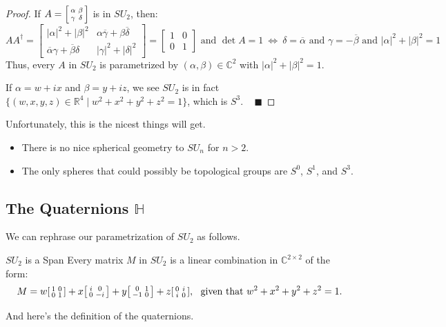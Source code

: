 \begin{proof}
    If $A = \begin{bsmallmatrix} \alpha & \beta \\ \gamma & \delta \end{bsmallmatrix}$ is in $SU_2$, then:
    \[ AA^{\dagger} = \begin{bmatrix} |\alpha|^2 + |\beta|^2 & \alpha \overline{\gamma} + \beta \overline{\delta} \\ \overline{\alpha}\gamma + \overline{\beta}\delta & |\gamma|^2 + |\delta|^2 \end{bmatrix} = \begin{bmatrix} 1 & 0 \\ 0 & 1 \end{bmatrix} \text{ and } \det A = 1 ~ \iff ~ \delta = \overline{\alpha} \text{ and } \gamma = - \overline{\beta} \text{ and } |\alpha|^2 + |\beta|^2 = 1 \]
    Thus, every $A$ in $SU_2$ is parametrized by $(\alpha, \beta) \in \mathbb{C}^2$ with $|\alpha|^2 + |\beta|^2 = 1$.
    
    If $\alpha = w + ix$ and $\beta = y + iz$, we see $SU_2$ is in fact $\{(w, x, y, z) \in \mathbb{R}^4 \mid w^2 + x^2 + y^2 + z^2 = 1\}$, which is $S^3$. ~ $\blacksquare$
\end{proof}

\begin{remark}
    Unfortunately, this is the nicest things will get.
    \begin{itemize}
        \item There is no nice spherical geometry to $SU_n$ for $n > 2$.
        \item The only spheres that could possibly be topological groups are $S^0$, $S^1$, and $S^3$.
    \end{itemize}
\end{remark}

\subsection{The Quaternions $\mathbb{H}$}

We can rephrase our parametrization of $SU_2$ as follows.

\begin{theorem}{$SU_2$ is a Span}
    Every matrix $M$ in $SU_2$ is a linear combination in $\mathbb{C}^{2 \times 2}$ of the form:
    \[ M = w \begin{bsmallmatrix} 1 & 0 \\ 0 & 1 \end{bsmallmatrix} + x\begin{bsmallmatrix} i & 0 \\ 0 & -i \end{bsmallmatrix} + y\begin{bsmallmatrix} 0 & 1 \\ -1 & 0 \end{bsmallmatrix} + z\begin{bsmallmatrix} 0 & i \\ i & 0 \end{bsmallmatrix}, ~ \text{ given that } w^2 + x^2 + y^2 + z^2 = 1. \]
\end{theorem}
And here's the definition of the quaternions.

